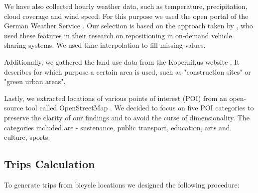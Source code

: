 We have also collected hourly weather data, such as temperature, precipitation, cloud coverage and wind speed. For this purpose we used the open portal of the German Weather Service . Our selection is based on the approach taken by , who used these features in their research on repositioning in on-demand vehicle sharing systems. We used time interpolation to fill missing values. 

Additionally, we gathered the land use data from the Kopernikus website . It describes for which purpose a certain area is used, such as "construction sites" or "green urban areas".

Lastly, we extracted locations of various points of interest (POI) from an open-source tool called  OpenStreetMap . We decided to focus on five POI categories to preserve the clarity of our findings and to avoid the curse of dimensionality. The categories included are - sustenance, public transport, education, arts and culture, sports. 

\subsection{Trips Calculation}
To generate trips from bicycle locations we designed the following procedure:

